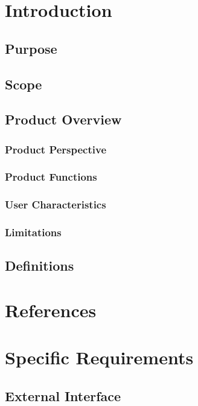 \documentclass[ 10pt]{report}
\begin{document}
    \chapter{Introduction}
        \section{Purpose}
        \section{Scope}
        \section{Product Overview}
            \subsection{Product Perspective}
            \subsection{Product Functions}
            \subsection{User Characteristics}
            \subsection{Limitations}
        \section{Definitions}
    \pagebreak

    \chapter{References}
    \pagebreak

    \chapter{Specific Requirements}
        \section{External Interface}
\end{document}
